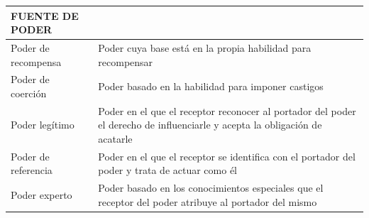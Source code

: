 \documentclass[
]{krantz}
\begin{document}
\begin{longtable}[]{@{}ll@{}}
\toprule
\begin{minipage}[b]{0.47\columnwidth}\raggedright
FUENTE DE PODER\strut
\end{minipage} & \begin{minipage}[b]{0.47\columnwidth}\raggedright
\strut
\end{minipage}\tabularnewline
\midrule
\endhead
\begin{minipage}[t]{0.47\columnwidth}\raggedright
Poder de recompensa\strut
\end{minipage} & \begin{minipage}[t]{0.47\columnwidth}\raggedright
Poder cuya base está en la propia habilidad para recompensar\strut
\end{minipage}\tabularnewline
\begin{minipage}[t]{0.47\columnwidth}\raggedright
Poder de coerción\strut
\end{minipage} & \begin{minipage}[t]{0.47\columnwidth}\raggedright
Poder basado en la habilidad para imponer castigos\strut
\end{minipage}\tabularnewline
\begin{minipage}[t]{0.47\columnwidth}\raggedright
Poder legítimo\strut
\end{minipage} & \begin{minipage}[t]{0.47\columnwidth}\raggedright
Poder en el que el receptor reconocer al portador del poder el derecho de influenciarle y acepta la obligación de acatarle\strut
\end{minipage}\tabularnewline
\begin{minipage}[t]{0.47\columnwidth}\raggedright
Poder de referencia\strut
\end{minipage} & \begin{minipage}[t]{0.47\columnwidth}\raggedright
Poder en el que el receptor se identifica con el portador del poder y trata de actuar como él\strut
\end{minipage}\tabularnewline
\begin{minipage}[t]{0.47\columnwidth}\raggedright
Poder experto\strut
\end{minipage} & \begin{minipage}[t]{0.47\columnwidth}\raggedright
Poder basado en los conocimientos especiales que el receptor del poder atribuye al portador del mismo\strut
\end{minipage}\tabularnewline
\bottomrule
\end{longtable}
\end{document}
